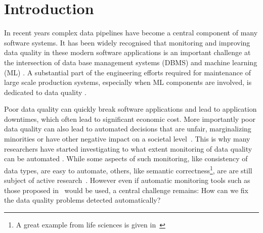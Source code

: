 \section{Introduction}
\label{sec:introduction}

In recent years complex data pipelines have become a central component of many software systems. It has been widely recognised that monitoring and improving data quality in these modern software applications is an important challenge at the intersection of data base management systems (DBMS) and machine learning (ML) \citep{Schelter2015,Abedjan2018}. A substantial part of the engineering efforts required for maintenance of large scale production systems, especially when ML components are involved, is dedicated to data quality \citep{Sculley2015,Bose2017b}.

Poor data quality can quickly break software applications and lead to application downtimes, which often lead to significant economic cost. More importantly poor data quality can also lead to automated decisions that are unfair, marginalizing minorities or have other negative impact on a societal level~\citep{Stoyanovich2020,Yang2020,Bender2021}. This is why many researchers have started investigating to what extent monitoring of data quality can be automated \citep{Abedjan2016,Baylor2017,Schelter2018,rukat2020towards}. While some aspects of such monitoring, like consistency of data types, are easy to automate, others, like semantic correctness\footnote{A great example from life sciences is given in~\citep{Ziemann2016}}, are are still subject of active research~\citep{biessmann2021automated}. However even if automatic monitoring tools such as those proposed in~\citep{Schelter2017} would be used, a central challenge remains: How can we fix the data quality problems detected automatically?

